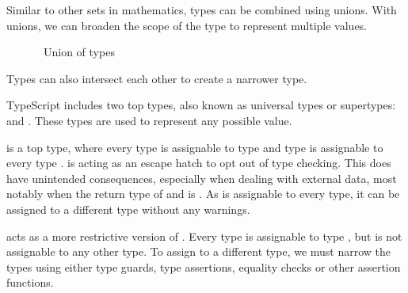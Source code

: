 Similar to other sets in mathematics, types can be combined using unions. With unions, we can broaden the scope of the type to represent multiple values.

\begin{figure}[h]
  \centering
  \caption{~Union of types}
\end{figure}

Types can also intersect each other to create a narrower type.


TypeScript includes two top types, also known as universal types or supertypes:  and . These types are used to represent any possible value.

 is a top type, where every type is assignable to type  and type  is assignable to every type \cite{TopTypesAny}.  is acting as an escape hatch to opt out of type checking. This does have unintended consequences, especially when dealing with external data, most notably when the return type of  and  is . As  is assignable to every type, it can be assigned to a different type without any warnings.


 acts as a more restrictive version of . Every type is assignable to type , but  is not assignable to any other type. To assign  to a different type, we must narrow the types using either type guards, type assertions, equality checks or other assertion functions.

